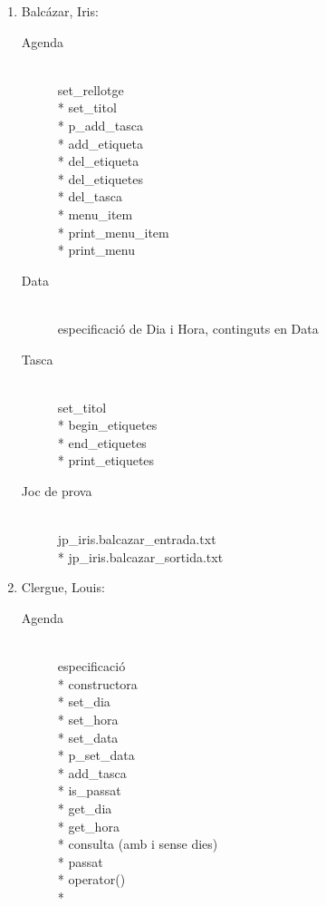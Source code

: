 \documentclass[a4paper,10pt]{article}
\begin{document}
\begin{enumerate}
  \item \textsf{Balc\'{a}zar, Iris}:
  \begin{description}
    \item[Agenda] \hfill \\
    set_rellotge \\*
    set_titol \\*
    p_add_tasca \\*  
    add_etiqueta \\*
    del_etiqueta \\*
    del_etiquetes \\*
    del_tasca \\*
    menu_item \\*
    print_menu_item \\*
    print_menu
    \item[Data] \hfill \\
    especificaci\'o de Dia i Hora, continguts en Data
    \item[Tasca] \hfill \\
    set_titol \\*
    begin_etiquetes \\*
    end_etiquetes \\*
    print_etiquetes
    \item[Joc de prova] \hfill \\
    jp_iris.balcazar_entrada.txt \\*
    jp_iris.balcazar_sortida.txt
  \end{description}
  \item \textsf{Clergue, Louis}:
  \begin{description}
    \item[Agenda] \hfill \\
    especificaci\'o \\*
    constructora \\*
    set_dia \\*
    set_hora \\*
    set_data \\*
    p_set_data \\*
    add_tasca \\*
    is_passat \\*
    get_dia \\*
    get_hora \\*
    consulta (amb i sense dies) \\*
    passat \\*
    operator() \\*

\end{description}
\end{enumerate}
\end{document}
